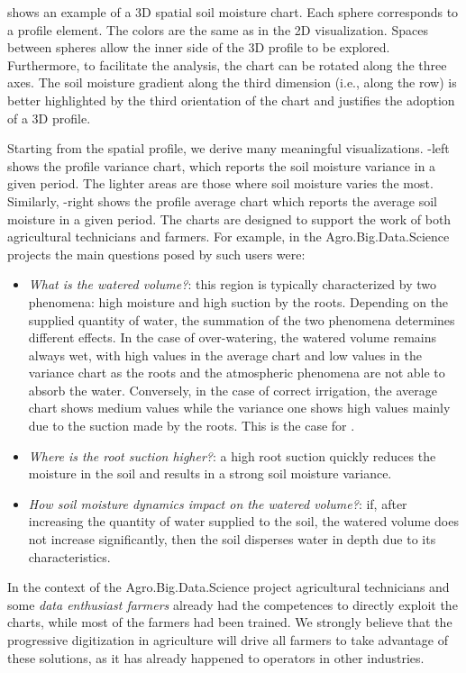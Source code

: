  shows an example of a 3D spatial soil moisture chart.
Each sphere corresponds to a profile element. The colors are the same as in the 2D visualization.
Spaces between spheres allow the inner side of the 3D profile to be explored. Furthermore, to facilitate the analysis, the chart can be rotated along the three axes. 
The soil moisture gradient along the third dimension (i.e., along the row) is better highlighted by the third orientation of the chart and justifies the adoption of a 3D profile.

Starting from the spatial profile, we derive many meaningful visualizations. -left shows the profile variance chart, which reports the soil moisture variance in a given period.
The lighter areas are those where soil moisture varies the most. Similarly, -right shows the profile average chart which reports the average soil moisture in a given period.
The charts are designed to support the work of both agricultural technicians and farmers. For example, in the Agro.Big.Data.Science projects the main questions posed by such users were:
\begin{itemize}
    \item \emph{What is the watered volume?}:
    this region is typically characterized by two phenomena: high moisture and high suction by the roots.
    Depending on the supplied quantity of water, the summation of the two phenomena determines different effects.
    In the case of over-watering, the watered volume remains always wet, with high values in the average chart and low values in the variance chart as the roots and the atmospheric phenomena are not able to absorb the water.
    Conversely, in the case of correct irrigation, the average chart shows medium values while the variance one shows high values mainly due to the suction made by the roots. This is the case for . 
    \item \emph{Where is the root suction higher?}: 
    a high root suction quickly reduces the moisture in the soil and results in a strong soil moisture variance. 
    \item \emph{How soil moisture dynamics impact on the watered volume?}: if, after increasing the quantity of water supplied to the soil, the watered volume does not increase significantly, then the soil disperses water in depth due to its characteristics.
\end{itemize}
In the context of the Agro.Big.Data.Science project agricultural technicians and some \emph{data enthusiast farmers} \cite{morton2014support} already had the competences to directly exploit the charts, while most of the farmers had been trained. We strongly believe that the progressive digitization in agriculture will drive all farmers to take advantage of these solutions, as it has already happened to operators in other industries.

